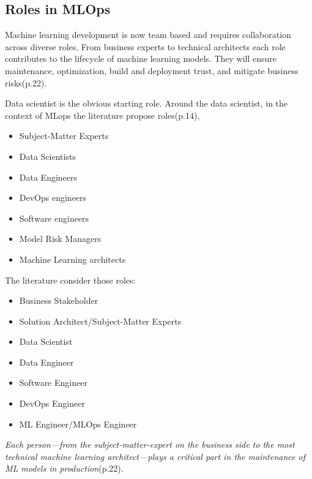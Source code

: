 \subsection{Roles in MLOps}\label{subsec:actors}

Machine learning development is now team based and requires collaboration across diverse roles.
From business experts to technical architects each role contributes to the lifecycle of machine learning models.
They will ensure maintenance, optimization, build and deployment trust, and mitigate business risks\cite{treveil2020introducing}(p.22).

Data scientist is the obvious starting role.
Around the data scientist, in the context of MLops the literature
propose roles\cite{treveil2020introducing}(p.14),
\begin{itemize}
    \item Subject-Matter Experts
    \item Data Scientists
    \item Data Engineers
    \item DevOps engineers
    \item Software engineers
    \item Model Risk Managers
    \item Machine Learning architects
\end{itemize}
The literature consider those roles\cite{Kreuzberger2022MachineLO}:

\begin{itemize}
    \item Business Stakeholder
    \item Solution Architect/Subject-Matter Experts
    \item Data Scientist
    \item Data Engineer
    \item Software Engineer
    \item DevOps Engineer
    \item ML Engineer/MLOps Engineer
\end{itemize}

\textit{Each person—from the subject-matter-expert on the business side to the most
technical machine learning architect—plays a critical part in the maintenance of ML
models in production}\cite{treveil2020introducing}(p.22).

